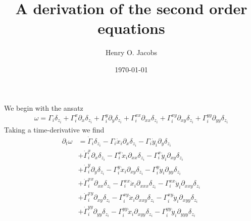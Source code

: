 \documentclass[12pt]{amsart}
\title{A derivation of the second order equations}
\author{Henry O. Jacobs}
\date{\today}
\begin{document}
\maketitle

We begin with the ansatz
\begin{align*}
  \omega = \Gamma_i \delta_{z_i}
  + \Gamma_i^x \partial_x \delta_{z_i}
  + \Gamma_i^y \partial_y \delta_{z_i}
  + \Gamma_i^{xx} \partial_{xx} \delta_{z_i} +
  \Gamma_i^{xy} \partial_{xy} \delta_{z_i} + \Gamma_i^{yy} \partial_{yy} \delta_{z_i}
\end{align*}
Taking a time-derivative we find
\begin{align*}
  \partial_t \omega &= \dot{\Gamma}_i \delta_{z_i} 
  - \Gamma_i \dot{x}_i \partial_{x} \delta_{z_i}
  - \Gamma_i \dot{y}_i \partial_{y} \delta_{z_i} \\
  &+ \dot{\Gamma}_i^x \partial_{x} \delta_{z_i}
  - \Gamma_i^x \dot{x}_i \partial_{xx} \delta_{z_i}
  - \Gamma_i^x \dot{y}_i \partial_{xy} \delta_{z_i} \\
  &+ \dot{\Gamma}_i^y \partial_{y} \delta_{z_i}
  - \Gamma_i^y \dot{x}_i \partial_{xy} \delta_{z_i}
  - \Gamma_i^y \dot{y}_i \partial_{yy} \delta_{z_i} \\
  &+ \dot{\Gamma}_i^{xx} \partial_{xx} \delta_{z_i}
  - \Gamma_i^{xx} \dot{x}_i \partial_{xxx} \delta_{z_i}
  - \Gamma_i^{xx} \dot{y}_i \partial_{xxy} \delta_{z_i} \\
  &+ \dot{\Gamma}_i^{xy} \partial_{xy} \delta_{z_i}
  - \Gamma_i^{xy} \dot{x}_i \partial_{xxy} \delta_{z_i}
  - \Gamma_i^{xy} \dot{y}_i \partial_{xyy} \delta_{z_i} \\
  &+ \dot{\Gamma}_i^{yy} \partial_{yy} \delta_{z_i}
  - \Gamma_i^{yy} \dot{x}_i \partial_{x yy} \delta_{z_i}
  - \Gamma_i^{yy} \dot{y}_i \partial_{yyy} \delta_{z_i} 
\end{align*}
\end{document}

